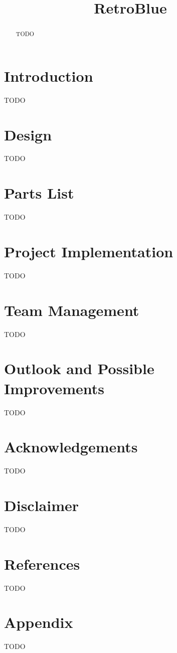 \documentclass{es50report}
\title{RetroBlue}
\begin{document}
    \maketitlepage

    \begin{abstract}
        TODO
    \end{abstract}
    \newpage

    \section{Introduction}
    TODO

    \section{Design}
    TODO

    \section{Parts List}
    TODO

    \section{Project Implementation}
    TODO

    \section{Team Management}
    TODO

    \section{Outlook and Possible Improvements}
    TODO

    \section{Acknowledgements}
    TODO

    \section{Disclaimer}
    TODO

    \section{References}
    TODO

    \appendix
    \section{Appendix}
    TODO
\end{document}
